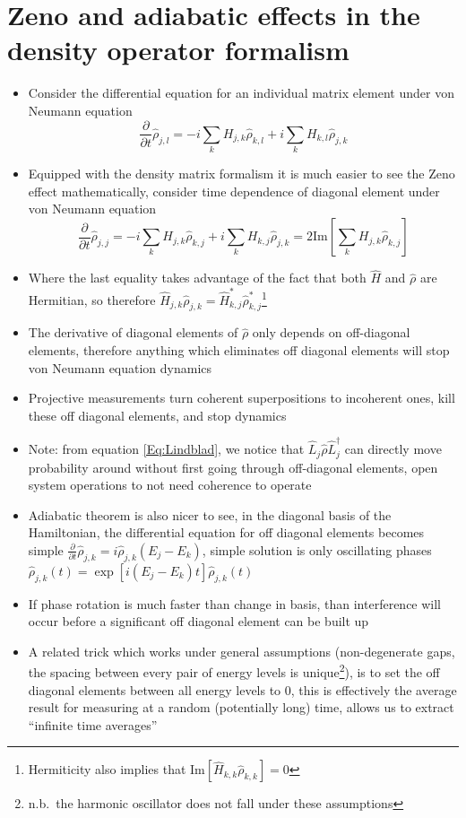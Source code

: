 \documentclass[english]{article}
\begin{document}
\section{Zeno and adiabatic effects in the density operator formalism}
\begin{itemize}
\item Consider the differential equation for an individual matrix element under von Neumann equation
\begin{equation}
\frac{\partial}{\partial t}\hat{\rho}_{j,l}=-i\sum_{k}H_{j,k}\hat{\rho}_{k,l}+i\sum_{k}H_{k,l}\hat{\rho}_{j,k}
\end{equation}
\item Equipped with the density matrix formalism it is much easier to see the Zeno effect mathematically, consider time dependence of diagonal element under von Neumann equation
\begin{equation}
\frac{\partial}{\partial t}\hat{\rho}_{j,j}=-i\sum_{k}H_{j,k}\hat{\rho}_{k,j}+i\sum_{k}H_{k,j}\hat{\rho}_{j,k}=2\mathrm{Im}[\sum_k H_{j,k}\hat{\rho}_{k,j}]
\end{equation}
\item Where the last equality takes advantage of the fact that both $\hat{H}$ and $\hat{\rho}$ are Hermitian, so therefore $\hat{H}_{j,k}\hat{\rho}_{j,k}=\hat{H}^*_{k,j}\hat{\rho}^*_{k,j}$\footnote{Hermiticity also implies that $\mathrm{Im}[\hat{H}_{k,k}\hat{\rho}_{k,k}]=0$}
\item The derivative of diagonal elements of $\hat{\rho}$ only depends on off-diagonal elements, therefore anything which eliminates off diagonal elements will stop von Neumann equation dynamics
\item Projective measurements turn coherent superpositions to incoherent ones, kill these off diagonal elements, and stop dynamics
\item Note: from equation \ref{Eq:Lindblad}, we notice that $\hat{L}_j\hat{\rho}\hat{L}^\dagger_j$ can directly move probability around without first going through off-diagonal elements, open system operations to not need coherence to operate
\item Adiabatic theorem is also nicer to see, in the diagonal basis of the Hamiltonian, the differential equation for off diagonal elements becomes simple $\frac{\partial}{\partial t}\hat{\rho}_{j,k}=i\hat{\rho}_{j,k}(E_j-E_k)$, simple solution is only oscillating phases $\hat{\rho}_{j,k}(t)=\exp[i(E_j-E_k)t]\hat{\rho}_{j,k}(t)$
\item If phase rotation is much faster than change in basis, than interference will occur before a significant off diagonal element can be built up
\item A related trick which works under general assumptions (non-degenerate gaps, the spacing between every pair of energy levels is unique\footnote{n.b.~the harmonic oscillator does not fall under these assumptions}), is to set the off diagonal elements between all energy levels to $0$, this is effectively the average result for measuring at a random (potentially long) time, allows us to extract ``infinite time averages''
\end{itemize}
\end{document}
